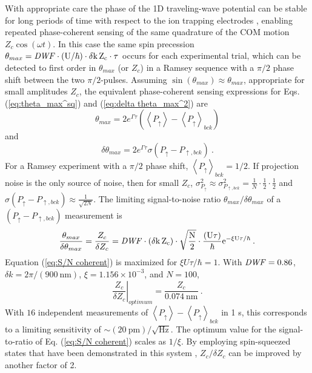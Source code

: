 \documentclass[aps,prl,onecolumn,superscriptaddress,floatfix]{revtex4-1}
\begin{document}
With appropriate care the phase of the 1D traveling-wave potential can be stable for long
periods of time with respect to the ion trapping electrodes \citep{Hume2011}, enabling repeated phase-coherent sensing of the same quadrature of the COM motion $Z_{c}\cos(\omega t)$.
In this case the same spin precession $\theta_{max}=\rm{\it{DWF}}\cdot\left(U/\hbar\right)\cdot\delta k\,Z_{c}\cdot\tau$
occurs for each experimental trial, which can be detected to first
order in $\theta_{max}$ (or $Z_{c}$) in a Ramsey sequence with a
$\pi/2$ phase shift between the two $\pi/2$-pulses. Assuming $\sin\left(\theta_{max}\right)\approx\theta_{max}$,
appropriate for small amplitudes $Z_{c}$, the equivalent phase-coherent
sensing expressions for Eqs. (\ref{eq:theta_max^sq}) and (\ref{eq:delta theta_max^2})
are
\begin{equation}
\theta_{max}=2e^{\Gamma\tau}\left(\left\langle P_{\uparrow}\right\rangle -\left\langle P_{\uparrow}\right\rangle _{bck}\right)\label{eq:theta_max coherent}
\end{equation}
and
\begin{equation}
\delta\theta_{max}=2e^{\Gamma\tau}\sigma\left( P_{\uparrow} - P_{\uparrow,bck}\right)\:.\label{eq:delta theta_max coherent}
\end{equation}
For a Ramsey experiment with a $\pi/2$ phase shift, $\left\langle P_{\uparrow}\right\rangle _{bck}=1/2$.
If projection noise is the only source of noise, then for small $Z_{c}$,
$\sigma_{P_{\uparrow}}^2\approx\sigma_{P_{\uparrow, bck}}^2=\frac{1}{N}\cdot\frac{1}{2}\cdot\frac{1}{2}$
and $\sigma\left( P_{\uparrow} - P_{\uparrow,bck} \right)\approx\frac{1}{\sqrt{2N}}$.
The limiting signal-to-noise ratio $\theta_{max}/\delta\theta_{max}$
of a $(P_{\uparrow} - P_{\uparrow,bck})$
measurement is
\begin{equation}
\frac{\theta_{max}}{\delta\theta_{max}}=\frac{Z_{c}}{\delta Z_{c}}=\rm{\it{DWF}}\cdot\left(\delta k\,Z_{c}\right)\cdot\sqrt{\frac{N}{2}}\cdot\frac{\left(U\tau\right)}{\hbar}e^{-\xi U\tau/\hbar}\:.\label{eq:S/N coherent}
\end{equation}
Equation (\ref{eq:S/N coherent}) is maximized for $\xi U\tau/\hbar=1$.
With $\rm{\it{DWF}}=0.86$, $\delta k=2\pi/\left(900\:\mathrm{nm}\right)$,
$\xi=1.156\times10^{-3}$, and $N=100$,
\begin{equation}
\left.\frac{Z_{c}}{\delta Z_{c}}\right|_{optimum}=\frac{Z_{c}}{0.074\:\mathrm{nm}}\:.\label{eq:coherent optimum}
\end{equation}
With $16$ independent measurements of $\left\langle P_{\uparrow}\right\rangle -\left\langle P_{\uparrow}\right\rangle _{bck}$
in 1 s, this corresponds to a limiting sensitivity of $\sim\left(20\:\mathrm{pm}\right)/\sqrt{\mathrm{Hz}}$.
The optimum value for the signal-to-ratio of Eq. (\ref{eq:S/N coherent})
scales as $1/\xi$. By employing spin-squeezed states that
have been demonstrated in this system \citep{Bohnet2015},
$Z_{c}/\delta Z_{c}$ can be improved by another factor
of 2.
\end{document}
